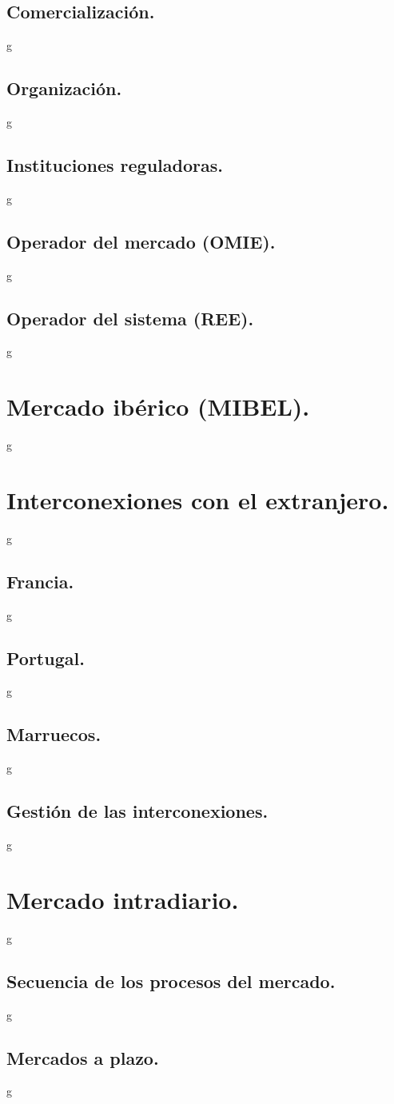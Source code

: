 \subsection{Comercialización.}
g
\subsection{Organización.}
g
\subsection{Instituciones reguladoras.}
g
\subsection{Operador del mercado (OMIE).}
g
\subsection{Operador del sistema (REE).}
g
\section{Mercado ibérico (MIBEL).}
g
\section{Interconexiones con el extranjero.}
g
\subsection{Francia.}
g
\subsection{Portugal.}
g
\subsection{Marruecos.}
g
\subsection{Gestión de las interconexiones.}
g
\section{Mercado intradiario.}
g
\subsection{Secuencia de los procesos del mercado.}
g
\subsection{Mercados a plazo.}
g
